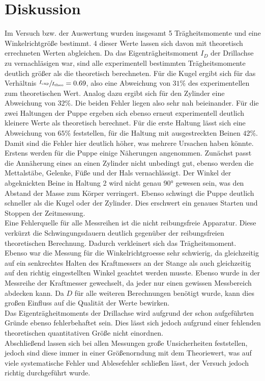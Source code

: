 \section{Diskussion}
\label{sec:Diskussion}
Im Versuch bzw. der Auswertung wurden insgesamt 5 Trägheitsmomente und eine Winkelrichtgröße bestimmt.
4 dieser Werte lassen sich davon mit theoretisch errechneten Werten abgleichen. Da das Eigenträgheitsmoment
$I_D$ der Drillachse zu vernachläsigen war, sind alle experimentell bestimmten Trägheitsmomente deutlich größer
als die theoretisch berechneten. Für die Kugel ergibt sich für das Verhältnis 
$\sfrac{I_\text{exp}}{I_\text{theo}}=0.69$, also eine Abweichung von $31\%$ des experimentellen zum theoretischen Wert.
Analog dazu ergibt sich für den Zylinder eine Abweichung von $32\%$. Die beiden Fehler liegen also sehr nah beieinander.
Für die zwei Haltungen der Puppe ergeben sich ebenso erneut experimentell deutlich kleinere Werte als theoretisch berechnet.
Für die erste Haltung lässt sich eine Abweichung von $65\%$ feststellen, für die Haltung mit ausgestreckten Beinen
$42\%$. Damit sind die Fehler hier deutlich höher, was mehrere Ursachen haben könnte. Erstens werden für die Puppe einige 
Näherungen angenommen. Zunächst passt die Annäherung eines an einen Zylinder nicht unbedingt gut, ebenso werden die Mettalstäbe,
Gelenke, Füße und der Hals vernachlässigt. Der Winkel der abgeknickten Beine in Haltung 2 wird nicht genau 90° gewesen sein, 
was den Abstand der Masse zum Körper verringert. Ebenso schwingt die Puppe deutlich schneller als die Kugel oder der
Zylinder. Dies erschwert ein genaues Starten und Stoppen der Zeitmessung.\\ \noindent
Eine Fehlerquelle für alle Messreihen ist die nicht reibungsfreie Apparatur. Diese verkürzt die Schwingungsdauern deutlich gegenüber
der reibungsfreien theoretischen Berechnung. Dadurch verkleinert sich das Trägheitsmoment. Ebenso war die Messung für die 
Winkelrichtgroesse sehr schwierig, da gleichzeitig auf ein senkrechtes Halten des Kraftmessers an der Stange als auch 
gleichzeitig auf den richtig eingestellten Winkel geachtet werden musste. Ebenso wurde in der Messreihe der Kraftmesser gewechselt, 
da jeder nur einen gewissen Messbereich abdecken kann. Da $D$ für alle weiteren Berechnungen benötigt wurde, kann dies großen Einfluss
auf die Qualität der Werte bewirken.\\ \noindent
Das Eigenträgheitmoments der Drillachse wird aufgrund der schon aufgeführten Gründe ebenso fehlerbehaftet sein. Dies lässt sich jedoch
aufgrund einer fehlenden theoretischen quantitativen Größe nicht einordnen.\\ \noindent
Abschließend lassen sich bei allen Messungen große Unsicherheiten feststellen, jedoch sind diese immer in einer Größenorndung mit dem 
Theoriewert, was auf viele systematische Fehler und Ablesefehler schließen lässt, der Versuch jedoch richtig durchgeführt wurde.       